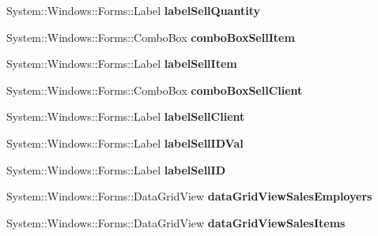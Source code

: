 \begin{DoxyCompactItemize}
\item 
\hypertarget{class_magazyn_1_1_magazin_a04ff9bd8bd865864681ea2b0d0c5b195}{}\label{class_magazyn_1_1_magazin_a04ff9bd8bd865864681ea2b0d0c5b195} 
System\+::\+Windows\+::\+Forms\+::\+Label {\bfseries label\+Sell\+Quantity}
\item 
\hypertarget{class_magazyn_1_1_magazin_a7121d63222ace4a42dcb4393bff69734}{}\label{class_magazyn_1_1_magazin_a7121d63222ace4a42dcb4393bff69734} 
System\+::\+Windows\+::\+Forms\+::\+Combo\+Box {\bfseries combo\+Box\+Sell\+Item}
\item 
\hypertarget{class_magazyn_1_1_magazin_ad2b1ae9e391c08d419de5f05e015fad0}{}\label{class_magazyn_1_1_magazin_ad2b1ae9e391c08d419de5f05e015fad0} 
System\+::\+Windows\+::\+Forms\+::\+Label {\bfseries label\+Sell\+Item}
\item 
\hypertarget{class_magazyn_1_1_magazin_a72590a94a9e97f590f816e068b563f9f}{}\label{class_magazyn_1_1_magazin_a72590a94a9e97f590f816e068b563f9f} 
System\+::\+Windows\+::\+Forms\+::\+Combo\+Box {\bfseries combo\+Box\+Sell\+Client}
\item 
\hypertarget{class_magazyn_1_1_magazin_ac83223a88b0f5b58ec6c667b16bd1cce}{}\label{class_magazyn_1_1_magazin_ac83223a88b0f5b58ec6c667b16bd1cce} 
System\+::\+Windows\+::\+Forms\+::\+Label {\bfseries label\+Sell\+Client}
\item 
\hypertarget{class_magazyn_1_1_magazin_a7d1a4cb165eeaec2df40bbda1fd0b253}{}\label{class_magazyn_1_1_magazin_a7d1a4cb165eeaec2df40bbda1fd0b253} 
System\+::\+Windows\+::\+Forms\+::\+Label {\bfseries label\+Sell\+I\+D\+Val}
\item 
\hypertarget{class_magazyn_1_1_magazin_ac9fefd07fb34e6ee6a1ad4b878b13a08}{}\label{class_magazyn_1_1_magazin_ac9fefd07fb34e6ee6a1ad4b878b13a08} 
System\+::\+Windows\+::\+Forms\+::\+Label {\bfseries label\+Sell\+ID}
\item 
\hypertarget{class_magazyn_1_1_magazin_a599b52dc6ce6485d2df41877cc829416}{}\label{class_magazyn_1_1_magazin_a599b52dc6ce6485d2df41877cc829416} 
System\+::\+Windows\+::\+Forms\+::\+Data\+Grid\+View {\bfseries data\+Grid\+View\+Sales\+Employers}
\item 
\hypertarget{class_magazyn_1_1_magazin_a5ad128db43134092c40e544471bc526c}{}\label{class_magazyn_1_1_magazin_a5ad128db43134092c40e544471bc526c} 
System\+::\+Windows\+::\+Forms\+::\+Data\+Grid\+View {\bfseries data\+Grid\+View\+Sales\+Items}
\item 
\hypertarget{class_magazyn_1_1_magazin_aab6588e70ff975f47f32eeb81f36d79b}{}\label{class_magazyn_1_1_magazin_aab6588e70ff975f47f32eeb81f36d79b} 

\end{DoxyCompactItemize}
